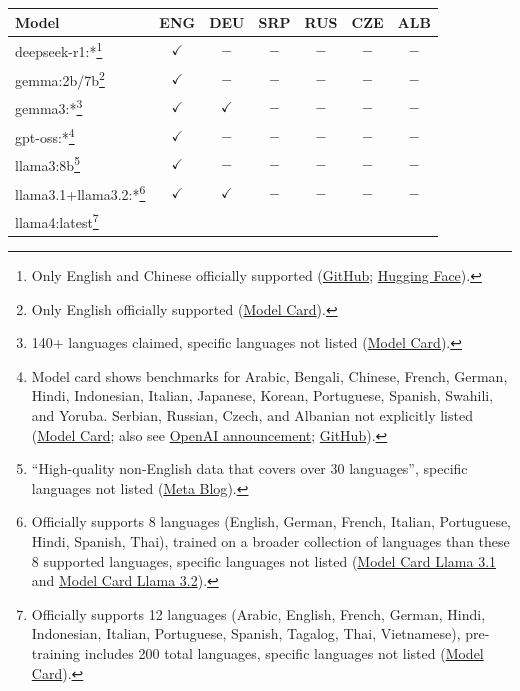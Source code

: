 \begin{tabular*}{\textwidth}{@{\extracolsep{\fill}}lcccccc}
\toprule
Model & ENG & DEU & SRP & RUS & CZE & ALB \\
\midrule
deepseek-r1:*\footnote{Only English and Chinese officially supported (\href{https://github.com/deepseek-ai/DeepSeek-R1}{GitHub}; \href{https://huggingface.co/deepseek-ai/DeepSeek-R1}{Hugging Face}).}
  & $\checkmark$ & $-$ & $-$ & $-$ & $-$ & $-$ \\
gemma:2b/7b\footnote{Only English officially supported (\href{https://ai.google.dev/gemma/docs/core/model_card}{Model Card}).}
  & $\checkmark$ & $-$ & $-$ & $-$ & $-$ & $-$ \\
gemma3:*\footnote{140+ languages claimed, specific languages not listed (\href{https://ai.google.dev/gemma/docs/core/model_card_3}{Model Card}).}
  & $\checkmark$ & $\checkmark$ & $-$ & $-$ & $-$ & $-$ \\
gpt-oss:*\footnote{Model card shows benchmarks for Arabic, Bengali, Chinese, French, German, Hindi, Indonesian, Italian, Japanese, Korean, Portuguese, Spanish, Swahili, and Yoruba. Serbian, Russian, Czech, and Albanian not explicitly listed (\href{https://arxiv.org/pdf/2508.10925}{Model Card}; also see \href{https://openai.com/index/introducing-gpt-oss/}{OpenAI announcement}; \href{https://github.com/openai/gpt-oss}{GitHub}).}
  & $\checkmark$ & $-$ & $-$ & $-$ & $-$ & $-$ \\
llama3:8b\footnote{``High-quality non-English data that covers over 30 languages'', specific languages not listed (\href{https://ai.meta.com/blog/meta-llama-3/}{Meta Blog}).}
  & $\checkmark$ & $-$ & $-$ & $-$ & $-$ & $-$ \\
llama3.1+llama3.2:*\footnote{Officially supports 8 languages (English, German, French, Italian, Portuguese, Hindi, Spanish, Thai), trained on a broader collection of languages than these 8 supported languages, specific languages not listed (\href{https://github.com/meta-llama/llama-models/blob/main/models/llama3_1/MODEL_CARD.md}{Model Card Llama 3.1} and \href{https://github.com/meta-llama/llama-models/blob/main/models/llama3_2/MODEL_CARD.md}{Model Card Llama 3.2}).}
  & $\checkmark$ & $\checkmark$ & $-$ & $-$ & $-$ & $-$ \\
llama4:latest\footnote{Officially supports 12 languages (Arabic, English, French, German, Hindi, Indonesian, Italian, Portuguese, Spanish, Tagalog, Thai, Vietnamese), pre-training includes 200 total languages, specific languages not listed (\href{https://github.com/meta-llama/llama-models/blob/main/models/llama4/MODEL_CARD.md}{Model Card}).}

\end{tabular*}
